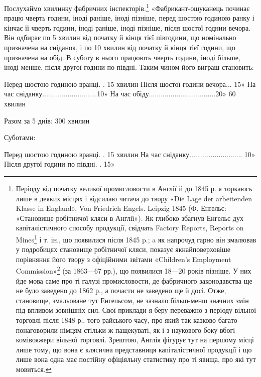 Послухаймо хвилинку фабричних інспекторів.\footnote{
Періоду від початку великої промисловости в Англії й до 1845 р.
я торкаюсь лише в деяких місцях і відсилаю читача до твору «Die Lage
der arbeitenden Klasse in England», Von Friedrich Engels. Leipzig 1845
(Ф. Енґельс: «Становище робітничої кляси в Англії»). Як глибоко збагнув
Енгельс дух капіталістичного способу продукції, свідчать Factory Reports,
Reports on Mines\footnote*{
— звіти фабричних інспекторів, звіти гірничих інспекторів. \emph{Ред.}
} і т. ін., що появилися після 1845 p.; a як напрочуд
гарно він змалював у подробицях становище робітничої кляси,
показує якнайповерховіше порівняння його твору з офіційними звітами
«Children’s Employment Commission»\footnote*{
— комісії для вивчення праці дітей. \emph{Ред.}
} (за 1863—67 рр.), що появилися
18—20 років пізніше. У них йде мова саме про ті галузі промисловости,
де фабричного законодавства ще не було заведено до 1862 р., а почасти не
заведено ще й досі. Отже, становище, змальоване тут Енгельсом, не зазнало
більш-менш значних змін під впливом зовнішніх сил. Свої приклади
я беру переважно з періоду вільної торговлі після 1848 р., того райського
часу, про який так казково багато понаговорили німцям стільки ж пащекуваті,
як і з наукового боку вбогі комівояжери вільної торговлі. Зрештою, Англія фігурує тут на першому
місці лише тому, що вона є клясична
представниця капіталістичної продукції і що лише вона одна має
постійну офіціяльну статистику про ті явища, про які тут мовиться.
}
«Фабрикант-ошуканець починає працю чверть години, іноді
раніше, іноді пізніше, перед шостою годиною ранку і кінчає її
чверть години, іноді раніше, іноді пізніше, після шостої годнии
вечора. Він одбирає по 5 хвилин від початку й кінця тієї півгодини,
що номінально призначена на сніданок, і по 10 хвилин від
початку й кінця тієї години, що призначена на обід. В суботу в
нього працюють чверть години, іноді більше, іноді менше, після
другої години по півдні. Таким чином його виграш становить:

Перед шостою годиною вранці. . 15 хвилин
Після шостої години    вечора... 15»
На час сніданку............................10»
На час обіду..................................20»
                                                                   60    хвилин

Разом за 5 днів: 300 хвилин

Суботами:

Перед шостою годиною вранці. . 15 хвилин
На час сніданку........................... 10»
Після другої години по півдні. .   15»

